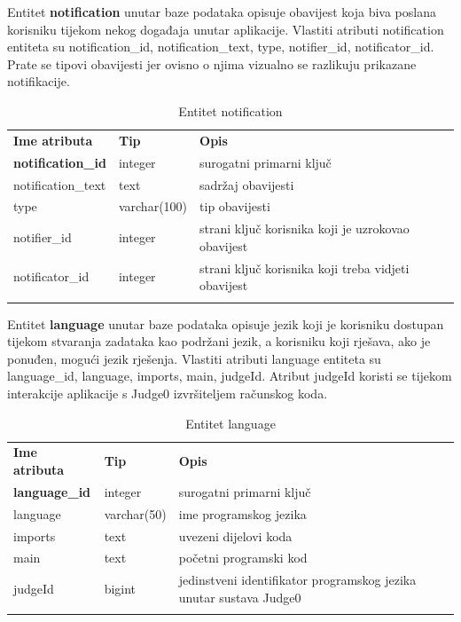 \documentclass[times, utf8, zavrsni, numeric]{fer}
\begin{document}
		Entitet \textbf{notification} unutar baze podataka opisuje obavijest koja biva poslana korisniku tijekom nekog događaja unutar aplikacije. Vlastiti atributi notification entiteta su notification\_id, notification\_text, type, notifier\_id, notificator\_id. Prate se tipovi obavijesti jer ovisno o njima vizualno se razlikuju prikazane notifikacije.
		\begin{table}[H]
			\caption{Entitet notification}
			\label{tbl:notification}
			\centering
			\begin{tabu} to \textwidth {XXX}
				\tabucline[1.75pt]{-}
				\textbf{Ime atributa} & \textbf{Tip} & \textbf{Opis}\\ 				
				\tabucline[1.75pt]{-}
				\textbf{notification\_id} & integer & surogatni primarni ključ\\ \hline
				notification\_text & text & sadržaj obavijesti\\ \hline
				type & varchar(100) & tip obavijesti\\ \hline
				notifier\_id & integer & strani ključ korisnika koji je uzrokovao obavijest\\ \hline
				notificator\_id & integer & strani ključ korisnika koji treba vidjeti obavijest\\ \hline
				\tabucline[1.75pt]{-}
			\end{tabu}
		\end{table}
	
		Entitet \textbf{language} unutar baze podataka opisuje jezik koji je korisniku dostupan tijekom stvaranja zadataka kao podržani jezik, a korisniku koji rješava, ako je ponuđen, mogući jezik rješenja. Vlastiti atributi language entiteta su language\_id, language, imports, main, judgeId. Atribut judgeId koristi se tijekom interakcije aplikacije s Judge0 izvršiteljem računskog koda. 
		\begin{table}[H]
			\caption{Entitet language}
			\label{tbl:language}
			\centering
			\begin{tabu} to \textwidth {XXX}
				\tabucline[1.75pt]{-}
				\textbf{Ime atributa} & \textbf{Tip} & \textbf{Opis}\\ 				
				\tabucline[1.75pt]{-}
				\textbf{language\_id} & integer & surogatni primarni ključ\\ \hline
				language & varchar(50) & ime programskog jezika\\ \hline
				imports & text & uvezeni dijelovi koda\\ \hline
				main & text & početni programski kod\\ \hline
				judgeId & bigint & jedinstveni identifikator programskog jezika unutar sustava Judge0\\ \hline
				\tabucline[1.75pt]{-}
			\end{tabu}
		\end{table}
	
\end{document}
